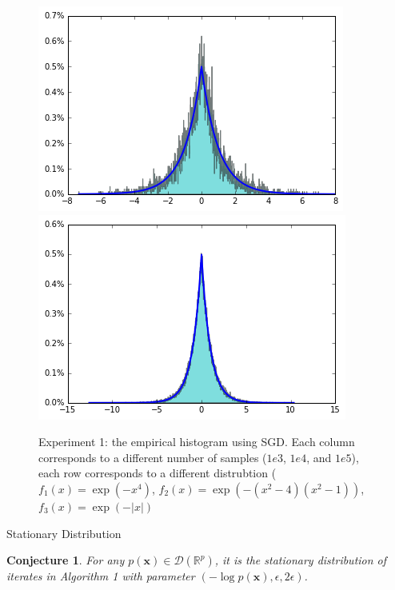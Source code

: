 \documentclass[final]{beamer}
\newlength{\onecolwid}
\newcommand{\bx}{\mathbf{x}}
\newcommand{\R}{\mathbb{R}}
\newcommand{\D}{\mathscr{D}}
\newtheorem{conjecture}{Conjecture}
\begin{document}
\begin{frame}[t]
\begin{columns}[t]
\begin{column}{\onecolwid}
\begin{figure}
    \includegraphics[width=.3\onecolwid]{../figure/case3_step_0.005_iter_1e4.png}
    \includegraphics[width=.3\onecolwid]{../figure/case3_step_0.005_iter_1e5.png}
    \caption{Experiment 1: the empirical histogram using SGD. Each column corresponds to a different number of samples ($1e3$, $1e4$, and $1e5$), each row corresponds to a different distrubtion ($f_1(x) = \exp(-x^4)$, $f_2(x) = \exp(-(x^2 - 4)(x^2 - 1))$, $f_3(x) = \exp(-|x|)$}
    \label{Fig:exp1}
\end{figure}


\begin{block}{Stationary Distribution}

\begin{conjecture}
For any $p(\bx)\in \D(\R^p)$, it is the stationary distribution of iterates in Algorithm 1 with parameter $(-\log p(\bx), \epsilon, 2\epsilon)$.
\end{conjecture}

\end{block}



\end{column}
\end{columns}
\end{frame}
\end{document}
